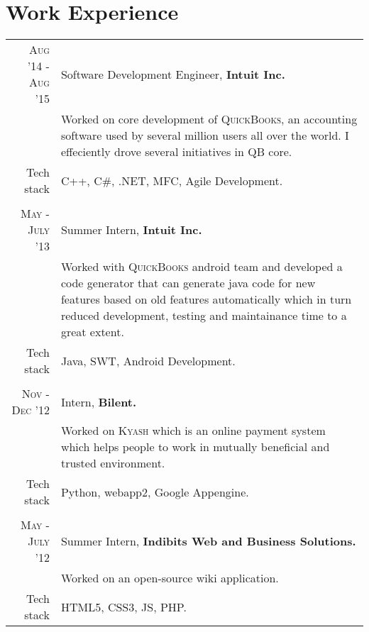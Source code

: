 \documentclass[a4paper]{article} %
\begin{document}
\section{Work Experience}
\renewcommand{\arraystretch}{0.85}%
\begin{tabular}{r|p{12cm}}
\textsc{Aug '14 - Aug '15} & Software Development Engineer, \textbf{Intuit Inc.} \\
& \small{Worked on core development of \textsc{QuickBooks}, an accounting software used by several million users all over the world. I effeciently drove several initiatives in QB core.}\\
\small{Tech stack} &\footnotesize{C++, C\#, .NET, MFC, Agile Development.} \\
\multicolumn{2}{c}{} \\

\textsc{May - July '13} & Summer Intern, \textbf{Intuit Inc.}\\ 
& \small{Worked with \textsc{QuickBooks} android  team and developed a code generator that can generate java code for new features based on old features automatically which in turn reduced development, testing and maintainance time to a great extent.}\\
\small{Tech stack} &\footnotesize{Java, SWT, Android Development.} \\
\multicolumn{2}{c}{} \\


\textsc{Nov - Dec '12} & Intern, \textbf{Bilent.}\\
& \small{Worked on \textsc{Kyash} which is an online payment system which helps people to
work in mutually beneficial and trusted environment.}\\
\small{Tech stack} &\footnotesize{Python, webapp2, Google Appengine.} \\
\multicolumn{2}{c}{} \\


\textsc{May - July '12} & Summer Intern, \textbf{Indibits Web and Business Solutions.}\\
& \small{Worked on an open-source wiki application.}\\
\small{Tech stack} &\footnotesize{HTML5, CSS3, JS, PHP.} \\
\end{tabular}
\end{document}
